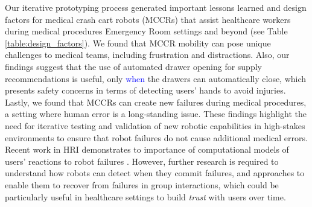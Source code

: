 Our iterative prototyping process generated important lessons learned and design factors for medical crash cart robots (MCCRs) that assist healthcare workers during medical procedures Emergency Room settings and beyond (see Table \ref{table:design_factors}). 
We found that MCCR mobility can pose unique challenges to medical teams, including frustration and distractions. 
Also, our findings suggest that the use of automated drawer opening for supply recommendations is useful, only \textcolor{blue}{when} the drawers can automatically close, which presents safety concerns in terms of detecting users' hands to avoid injuries. %
Lastly, we found that MCCRs can create new failures during medical procedures, a setting where human error is a long-standing issue. 
These findings highlight the need for iterative testing and validation of new robotic capabilities in high-stakes environments to ensure that robot failures do not cause additional medical errors.
Recent work in HRI demonstrates to importance of computational models of users' reactions to robot failures \cite{honig2022taxonomy,bremers2023bystander,bremers2023facial}.
However, further research is required to understand how robots can detect when they commit failures, and approaches to enable them to recover from failures in group interactions, which could be particularly useful in healthcare settings to build \textit{trust} with users over time.


